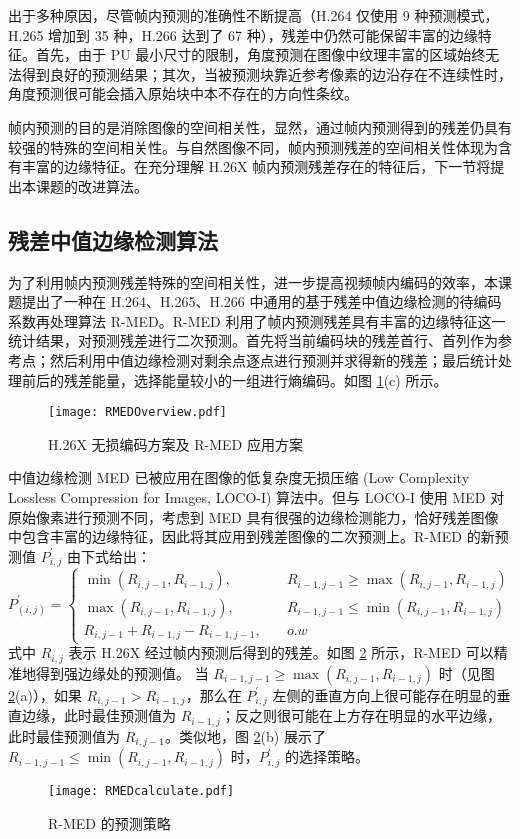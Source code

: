 出于多种原因，尽管帧内预测的准确性不断提高（H.264 仅使用 9 种预测模式，H.265 增加到 35 种，H.266 达到了 67 种），残差中仍然可能保留丰富的边缘特征。首先，由于 PU 最小尺寸的限制，角度预测在图像中纹理丰富的区域始终无法得到良好的预测结果；其次，当被预测块靠近参考像素的边沿存在不连续性时，角度预测很可能会插入原始块中本不存在的方向性条纹。

帧内预测的目的是消除图像的空间相关性，显然，通过帧内预测得到的残差仍具有较强的特殊的空间相关性。与自然图像不同，帧内预测残差的空间相关性体现为含有丰富的边缘特征。在充分理解 H.26X 帧内预测残差存在的特征后，下一节将提出本课题的改进算法。

\subsection{残差中值边缘检测算法}
为了利用帧内预测残差特殊的空间相关性，进一步提高视频帧内编码的效率，本课题提出了一种在 H.264、H.265、H.266 中通用的基于残差中值边缘检测的待编码系数再处理算法 R-MED。R-MED 利用了帧内预测残差具有丰富的边缘特征这一统计结果，对预测残差进行二次预测。首先将当前编码块的残差首行、首列作为参考点；然后利用中值边缘检测对剩余点逐点进行预测并求得新的残差；最后统计处理前后的残差能量，选择能量较小的一组进行熵编码。如图 \ref{fig:RMEDOverview}(c) 所示。
\begin{figure}[hbt]
    \centering
    \texttt{[image: RMEDOverview.pdf]}
    \caption{H.26X 无损编码方案及 R-MED 应用方案}
    \label{fig:RMEDOverview}
\end{figure}

中值边缘检测 MED 已被应用在图像的低复杂度无损压缩 (Low Complexity Lossless Compression for Images, LOCO-I) 算法中。但与 LOCO-I 使用 MED 对原始像素进行预测不同，考虑到 MED 具有很强的边缘检测能力，恰好残差图像中包含丰富的边缘特征，因此将其应用到残差图像的二次预测上。R-MED 的新预测值 $P_{i,j}^{'}$ 由下式给出：
\begin{equation}
    P_{(i,j)}^{'}=\left\{
    \begin{aligned}
        \min(R_{i,j-1},R_{i-1,j}), \quad       & R_{i-1,j-1} \geqslant \max(R_{i,j-1},R_{i-1,j}) \\
        \max(R_{i,j-1},R_{i-1,j}), \quad       & R_{i-1,j-1} \leqslant \min(R_{i,j-1},R_{i-1,j}) \\
        R_{i,j-1}+R_{i-1,j}-R_{i-1,j-1}, \quad & o.w
    \end{aligned}
    \right.
    \label{equ:LOCO-i}
\end{equation}
式中 $R_{i,j}$ 表示 H.26X 经过帧内预测后得到的残差。如图 \ref{fig:RMEDcalculate} 所示，R-MED 可以精准地得到强边缘处的预测值。
当 $R_{i-1,j-1} \geqslant \max(R_{i,j-1},R_{i-1,j})$ 时（见图 \ref{fig:RMEDcalculate}(a)），如果 $R_{i,j-1}>R_{i-1,j}$，那么在 $P_{i,j}^{'}$ 左侧的垂直方向上很可能存在明显的垂直边缘，此时最佳预测值为 $R_{i-1,j}$；反之则很可能在上方存在明显的水平边缘，此时最佳预测值为 $R_{i,j-1}$。类似地，图 \ref{fig:RMEDcalculate}(b) 展示了 $R_{i-1,j-1} \leqslant \min(R_{i,j-1},R_{i-1,j})$ 时，$P_{i,j}^{'}$ 的选择策略。
\begin{figure}[hbt]
    \centering
    \texttt{[image: RMEDcalculate.pdf]}
    \caption{R-MED 的预测策略}
    \label{fig:RMEDcalculate}
\end{figure}

